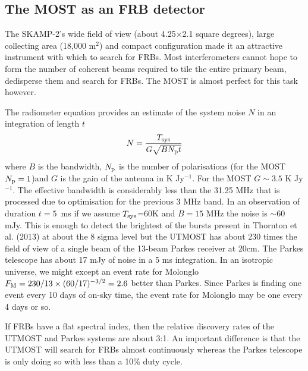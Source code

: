 \subsection{The MOST as an FRB detector}
The SKAMP-2's wide field of view (about 4.25$\times$2.1 square degrees), large collecting area (18,000 m$^2$) and compact configuration made it an attractive instrument with which to search for FRBs. Most interferometers cannot hope to form the number of coherent beams required to tile the entire primary beam, dedisperse them and search for FRBs. The MOST is almost perfect for this task however. 

The radiometer equation provides an estimate of the system noise $N$ in an integration of length $t$ 
\begin{equation}
N={{T_{\rm sys}}\over{G\sqrt{BN_{\rm p}t}}}
\end{equation}
\noindent where $B$ is the bandwidth, $N_{\rm p}$ is the number of polarisations (for the MOST $N_{\rm p}=1$)and $G$ is the gain of the antenna in K Jy$^{-1}$. For the MOST $G\sim 3.5$ K Jy$^{-1}$. The effective bandwidth is considerably less than the 31.25 MHz that is processed due to optimisation for the previous 3 MHz band. In an observation of duration $t=5$\, ms if we assume $T_{\rm sys}$=60K and $B=15 $ MHz the noise is $\sim$60 mJy. This is enough to detect the brightest of the bursts present in Thornton et al. (2013) at about the 8 sigma level but the UTMOST has about 230 times the field of view of a single beam of the 13-beam Parkes receiver at 20cm. The Parkes telescope has about 17 mJy of noise in a 5 ms integration. In an isotropic universe, we might except an event rate for Molonglo $F_{\rm M} = 230/13\times(60/17)^{-3/2}=2.6$ better than Parkes. Since Parkes is finding one event every 10 days of on-sky time, the event rate for Molonglo may be one every 4 days or so.

If FRBs have a flat spectral index, then the relative discovery rates of the UTMOST and Parkes systems are about 3:1. An important difference is that the UTMOST will search for FRBs almost continuously whereas the Parkes telescope is only doing so with less than a 10\% duty cycle.
